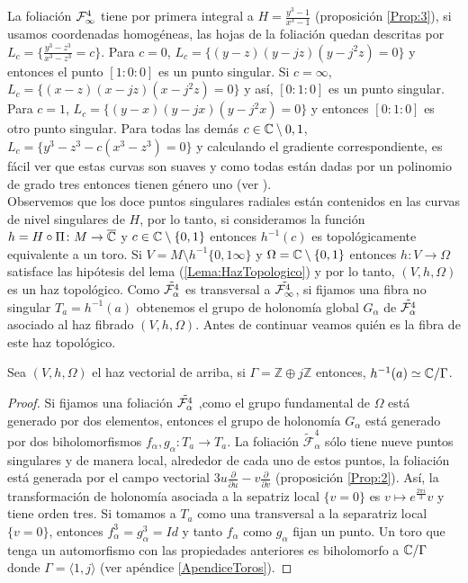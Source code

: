 La foliación $\Fol[4]{\infty}$ tiene por primera integral a $H=\tfrac{y^{3}-1}{x^{3}-1}$ (proposición \ref{Prop:3}), si usamos coordenadas homogéneas, las hojas de la foliación quedan descritas por $L_{c}=\{\tfrac{y^{3}-z^{3}}{x^{3}-z^{3}}=c\}$. Para $c=0$, $L_{c}=\{(y-z)(y-jz)(y-j^{2}z)=0\}$ y entonces el punto $[1:0:0]$ es un punto singular. Si $c=\infty$, $L_{c}=\{(x-z)(x-jz)(x-j^{2}z)=0\}$ y así, $[0:1:0]$ es un punto singular. Para $c=1$, $L_{c}=\{(y-x)(y-jx)(y-j^{2}x)=0\}$ y entonces $[0:1:0]$ es otro punto singular. Para todas las demás $c\in\C\setminus{0,1}$, $L_{c}=\{y^{3}-z^{3}-c(x^{3}-z^{3})=0\}$ y calculando el gradiente correspondiente, es fácil ver que estas curvas son suaves y como todas están dadas por un polinomio de grado tres entonces tienen género uno (ver \cite{FischerGerd}).\\

Observemos que los doce puntos singulares radiales están contenidos en las curvas de nivel singulares de $H$, por lo tanto, si consideramos la función $h=H\circ\Pi\colon M\rightarrow\overline{\C}$ y $c\in\C\setminus\{0,1\}$ entonces $h^{-1}(c)$ es topológicamente equivalente a un toro. Si $V=M\setminus h^{-1}\{0,1\infty\}$ y $\Omega=\C\setminus\{0,1\}$ entonces $h\colon V\rightarrow\Omega$ satisface las hipótesis del lema (\ref{Lema:HazTopologico}) y por lo tanto, $(V,h,\Omega)$ es un haz topológico. Como $\tilde{\Foli_{\alpha}^{4}}$ es transversal a $\tilde{\Foli_{\infty}^{4}}$, si fijamos una fibra no singular $T_{a}=h^{-1}(a)$ obtenemos el grupo de holonomía global $G_{\alpha}$ de $\tilde{\Foli_{\alpha}^{4}}$ asociado al haz fibrado $(V,h,\Omega)$. Antes de continuar veamos quién es la fibra de este haz topológico.
\begin{Proposicion}
\label{Prop:FibraDelHaz}
Sea $(V,h,\Omega)$ el haz vectorial de arriba, si $\Gamma=\mathbb{Z}\oplus j\mathbb{Z}$ entonces, $h^{-1}(a)\simeq\C/\Gamma$.
\end{Proposicion}
\begin{proof}
Si fijamos una foliación $\tilde{\Foli_{\alpha}^{4}}$ ,como el grupo fundamental de $\Omega$ está generado por dos elementos, entonces  el grupo de holonomía $G_{\alpha}$ está generado por dos biholomorfismos $f_{\alpha},g_{\alpha}\colon T_{a}\rightarrow T_{a}$. La foliación $\tilde{\mathcal{F}}_{\alpha}^{4}$ sólo tiene nueve puntos singulares y de manera local, alrededor de cada uno de estos puntos, la foliación está generada por el campo vectorial $3u\tfrac{\partial}{\partial u}-v\tfrac{\partial}{\partial v}$ (proposición \ref{Prop:2}). Así, la transformación de holonomía asociada a la sepatriz local $\{v=0\}$ es $v\mapsto e^{\tfrac{2\pi i}{3}}v$ y tiene orden tres. Si tomamos a $T_{a}$ como una transversal a la separatriz local $\{v=0\}$, entonces $f_{\alpha}^{3}=g_{\alpha}^{3}=Id$ y tanto $f_{\alpha}$ como $g_{\alpha}$ fijan un punto. Un toro que tenga un automorfismo con las propiedades anteriores es biholomorfo a $\C/\Gamma$ donde $\Gamma=\langle 1,j\rangle$ (ver apéndice \ref{ApendiceToros}).
\end{proof}

